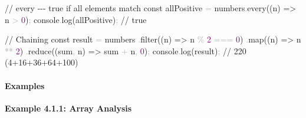 \documentclass[
  justified,
  openright,
]{tufte-book}
\let\subsubsection\paragraph
\let\paragraph\paragraph
\newcommand{\BuiltInTok}[1]{#1}
\newcommand{\CommentTok}[1]{\textcolor{MidGray}{#1}}
\newcommand{\DecValTok}[1]{\textcolor{Purple}{#1}}
\newcommand{\FunctionTok}[1]{\textcolor{BrandBlue}{#1}}
\newcommand{\KeywordTok}[1]{\textcolor{BrandBlue}{#1}}
\newcommand{\NormalTok}[1]{#1}
\newcommand{\OperatorTok}[1]{\textcolor{DarkGray}{#1}}
\newenvironment{Shaded}{%
  \begin{snugshade}
}{%
  \end{snugshade}
}
\let\subsubsection\paragraph
\let\paragraph\paragraph
\begin{document}
\begin{Shaded}
\begin{Highlighting}[]
\CommentTok{// every {-}{-}{-} true if all elements match}
\KeywordTok{const}\NormalTok{ allPositive }\OperatorTok{=}\NormalTok{ numbers}\OperatorTok{.}\FunctionTok{every}\NormalTok{((n) }\KeywordTok{=\textgreater{}}\NormalTok{ n }\OperatorTok{\textgreater{}} \DecValTok{0}\NormalTok{)}\OperatorTok{;}
\BuiltInTok{console}\OperatorTok{.}\FunctionTok{log}\NormalTok{(allPositive)}\OperatorTok{;} \CommentTok{// true}

\CommentTok{// Chaining}
\KeywordTok{const}\NormalTok{ result }\OperatorTok{=}\NormalTok{ numbers}
  \OperatorTok{.}\FunctionTok{filter}\NormalTok{((n) }\KeywordTok{=\textgreater{}}\NormalTok{ n }\OperatorTok{\%} \DecValTok{2} \OperatorTok{===} \DecValTok{0}\NormalTok{)}
  \OperatorTok{.}\FunctionTok{map}\NormalTok{((n) }\KeywordTok{=\textgreater{}}\NormalTok{ n }\OperatorTok{**} \DecValTok{2}\NormalTok{)}
  \OperatorTok{.}\FunctionTok{reduce}\NormalTok{((sum}\OperatorTok{,}\NormalTok{ n) }\KeywordTok{=\textgreater{}}\NormalTok{ sum }\OperatorTok{+}\NormalTok{ n}\OperatorTok{,} \DecValTok{0}\NormalTok{)}\OperatorTok{;}
\BuiltInTok{console}\OperatorTok{.}\FunctionTok{log}\NormalTok{(result)}\OperatorTok{;} \CommentTok{// 220  (4+16+36+64+100)}
\end{Highlighting}
\end{Shaded}

\subsubsection{Examples}\label{examples-4}

\textbf{Example 4.1.1: Array Analysis}
\end{document}

